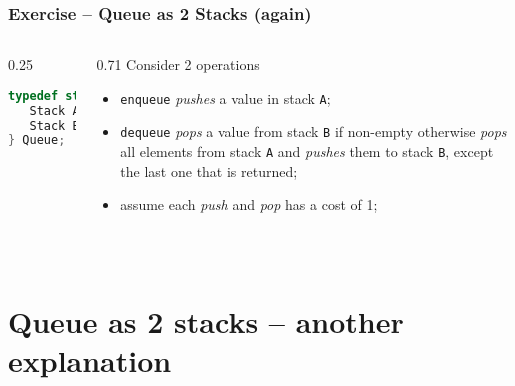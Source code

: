 \documentclass[aspectratio=169]{beamer}
\begin{document}
\begin{frame}[fragile]\frametitle{Exercise -- Queue as 2 Stacks (again)}

\begin{columns}
\begin{column}{0.25\textwidth}
\begin{lstlisting}[language=C++,emph={Stack,Queue}]
typedef struct queue {
   Stack A;
   Stack B;
} Queue;
\end{lstlisting}
\end{column}
\begin{column}{0.71\textwidth}
Consider 2 operations
\begin{itemize}
    \item \texttt{enqueue} \emph{pushes} a value in stack \texttt{A};
    \item \texttt{dequeue} \emph{pops} a value from stack \texttt{B} if non-empty otherwise \emph{pops} all elements from stack \texttt{A} and \emph{pushes} them to stack \texttt{B}, except the last one that is returned;
    \item assume each \emph{push} and \emph{pop} has a cost of 1;
  \end{itemize}
\end{column}
\end{columns}

~\\[-3mm]
\end{frame}




\section{Queue as 2 stacks -- another explanation}

\end{document}
